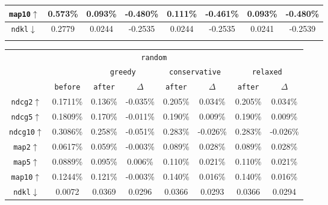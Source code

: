 \documentclass[runningheads]{llncs}
\begin{document}
\begin{table}[t]
\begin{tabular}{cccccccc}
\texttt{map10$\uparrow$}  & \multicolumn{1}{|c|}{0.573\%} & 0.093\% & \multicolumn{1}{c|}{-0.480\%} & 0.111\% & \multicolumn{1}{c|}{-0.461\%} & 0.093\%      & -0.480\%     \\ \hline \hline
\texttt{ndkl$\downarrow$}   & \multicolumn{1}{|c|}{0.2779}                       & 0.0244  & \multicolumn{1}{c|}{-0.2535}  & 0.0244  & \multicolumn{1}{c|}{-0.2535}  & 0.0241       & -0.2539      \\ \hline
\label{tbl:bnn}
\end{tabular}
\hfill
\centering
\begin{tabular}{cccccccc}\cline{3-8}
\multicolumn{8}{c}{\texttt{random}}                                                                                                                                  \\ \cline{3-8} 
       &                                  & \multicolumn{2}{c}{\texttt{greedy}}              & \multicolumn{2}{c}{\texttt{conservative}}        & \multicolumn{2}{c}{\texttt{relaxed}} \\ \cline{2-8} 
       & \multicolumn{1}{|c|}{\texttt{before}}      & \texttt{after}   & \multicolumn{1}{c|}{\texttt{\(\Delta \)}}        & \texttt{after}   & \multicolumn{1}{c|}{\texttt{\(\Delta \)}}        & \texttt{after}        & \texttt{\(\Delta \)}            \\ \hline \hline
\texttt{ndcg2$\uparrow$}  & \multicolumn{1}{|c|}{0.1711\%} & 0.136\% & \multicolumn{1}{c|}{-0.035\%} & 0.205\% & \multicolumn{1}{c|}{0.034\%}  & 0.205\%      & 0.034\%      \\
\texttt{ndcg5$\uparrow$}  & \multicolumn{1}{|c|}{0.1809\%} & 0.170\% & \multicolumn{1}{c|}{-0.011\%} & 0.190\% & \multicolumn{1}{c|}{0.009\%}  & 0.190\%      & 0.009\%      \\
\texttt{ndcg10$\uparrow$} & \multicolumn{1}{|c|}{0.3086\%} & 0.258\% & \multicolumn{1}{c|}{-0.051\%} & 0.283\% & \multicolumn{1}{c|}{-0.026\%} & 0.283\%      & -0.026\%     \\ \hline
\texttt{map2$\uparrow$}   & \multicolumn{1}{|c|}{0.0617\%} & 0.059\% & \multicolumn{1}{c|}{-0.003\%} & 0.089\% & \multicolumn{1}{c|}{0.028\%}  & 0.089\%      & 0.028\%      \\
\texttt{map5$\uparrow$}   & \multicolumn{1}{|c|}{0.0889\%}  & 0.095\% & \multicolumn{1}{c|}{0.006\%}  & 0.110\% & \multicolumn{1}{c|}{0.021\%}  & 0.110\%      & 0.021\%      \\
\texttt{map10$\uparrow$}  & \multicolumn{1}{|c|}{0.1244\%} & 0.121\% & \multicolumn{1}{c|}{-0.003\%} & 0.140\% & \multicolumn{1}{c|}{0.016\%}  & 0.140\%      & 0.016\%      \\ \hline \hline
\texttt{ndkl$\downarrow$}   & \multicolumn{1}{|c|}{0.0072}      & 0.0369  & \multicolumn{1}{c|}{0.0296}   & 0.0366  & \multicolumn{1}{c|}{0.0293}   & 0.0366       & 0.0294       \\ \hline
\end{tabular}
\vspace{-2em}
\end{table}
\end{document}
